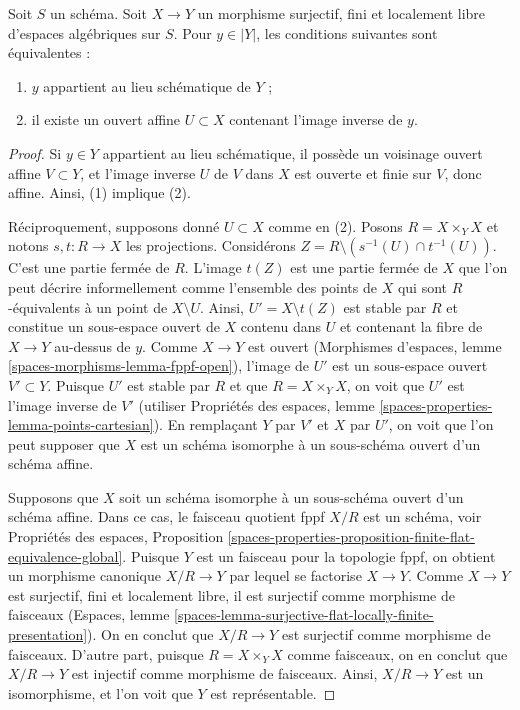\begin{lemma}
\label{lemma-when-quotient-scheme-at-point}
Soit $S$ un schéma. Soit $X \to Y$ un morphisme surjectif, fini et
localement libre d'espaces algébriques sur $S$. Pour $y \in |Y|$, les
conditions suivantes sont équivalentes :
\begin{enumerate}
\item $y$ appartient au lieu schématique de $Y$ ;
\item il existe un ouvert affine $U \subset X$ contenant l'image inverse
de $y$.
\end{enumerate}
\end{lemma}

\begin{proof}
Si $y \in Y$ appartient au lieu schématique, il possède un voisinage ouvert
affine $V \subset Y$, et l'image inverse $U$ de $V$ dans $X$ est ouverte et
finie sur $V$, donc affine. Ainsi, (1) implique (2).

\medskip\noindent
Réciproquement, supposons donné $U \subset X$ comme en (2).
Posons $R = X \times_Y X$ et notons $s, t : R \to X$ les projections.
Considérons $Z = R \setminus (s^{-1}(U) \cap t^{-1}(U))$.
C'est une partie fermée de $R$. L'image $t(Z)$ est une partie fermée
de $X$ que l'on peut décrire informellement comme l'ensemble des
points de $X$ qui sont $R$-équivalents à un point de
$X \setminus U$. Ainsi, $U' = X \setminus t(Z)$ est stable par $R$ et
constitue un sous-espace ouvert de $X$ contenu dans $U$ et contenant
la fibre de $X \to Y$ au-dessus de $y$. Comme $X \to Y$ est ouvert
(Morphismes d'espaces, lemme \ref{spaces-morphisms-lemma-fppf-open}),
l'image de $U'$ est un sous-espace ouvert $V' \subset Y$.
Puisque $U'$ est stable par $R$ et que $R = X \times_Y X$, on voit que $U'$
est l'image inverse de $V'$ (utiliser
Propriétés des espaces, lemme \ref{spaces-properties-lemma-points-cartesian}).
En remplaçant $Y$ par $V'$ et $X$ par $U'$, on voit que l'on peut supposer
que $X$ est un schéma isomorphe à un sous-schéma ouvert d'un schéma affine.

\medskip\noindent
Supposons que $X$ soit un schéma isomorphe à un sous-schéma ouvert d'un
schéma affine. Dans ce cas, le faisceau quotient fppf $X/R$ est un schéma,
voir Propriétés des espaces, Proposition
\ref{spaces-properties-proposition-finite-flat-equivalence-global}.
Puisque $Y$ est un faisceau pour la topologie fppf, on obtient un morphisme
canonique $X/R \to Y$ par lequel se factorise $X \to Y$. Comme $X \to Y$ est
surjectif, fini et localement libre, il est surjectif comme morphisme de
faisceaux
(Espaces, lemme \ref{spaces-lemma-surjective-flat-locally-finite-presentation}).
On en conclut que $X/R \to Y$ est surjectif comme morphisme de faisceaux.
D'autre part, puisque $R = X \times_Y X$ comme faisceaux, on en conclut que
$X/R \to Y$ est injectif comme morphisme de faisceaux. Ainsi, $X/R \to Y$
est un isomorphisme, et l'on voit que $Y$ est représentable.
\end{proof}

